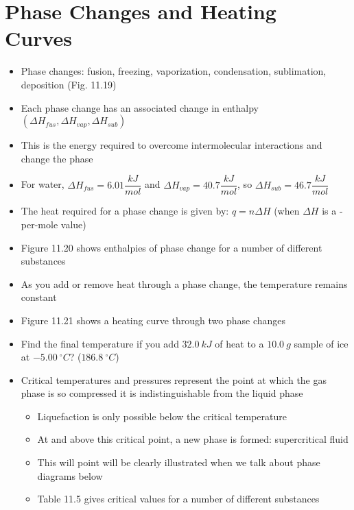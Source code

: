 \documentclass[12pt, openany, letterpaper]{memoir}
\begin{document}
\section{Phase Changes and Heating Curves}
\begin{itemize}
	\item Phase changes: fusion, freezing, vaporization, condensation, sublimation, deposition (Fig. 11.19)
	\item Each phase change has an associated change in enthalpy $\left(\Delta H_{fus}, \Delta H_{vap}, \Delta H_{sub}\right)$
	\item This is the energy required to overcome intermolecular interactions and change the phase
	\item For water, $\Delta H_{fus}=6.01\dfrac{kJ}{mol}$ and $\Delta H_{vap}=40.7\dfrac{kJ}{mol}$, so $\Delta H_{sub}=46.7\dfrac{kJ}{mol}$
	\item The heat required for a phase change is given by: $q=n\Delta H$ (when $\Delta H$ is a -per-mole value)
  \item Figure 11.20 shows enthalpies of phase change for a number of different substances
	\item As you add or remove heat through a phase change, the temperature remains constant
	\item Figure 11.21 shows a heating curve through two phase changes
	\item Find the final temperature if you add $32.0~kJ$ of heat to a $10.0~g$ sample of ice at $-5.00~^\circ C$? ($186.8~^\circ C$)
  \item Critical temperatures and pressures represent the point at which the gas phase is so compressed it is indistinguishable from the liquid phase
  \begin{itemize}
    \item Liquefaction is only possible below the critical temperature
    \item At and above this critical point, a new phase is formed: supercritical fluid
    \item This will point will be clearly illustrated when we talk about phase diagrams below
    \item Table 11.5 gives critical values for a number of different substances
  \end{itemize}
\end{itemize}
\end{document}
